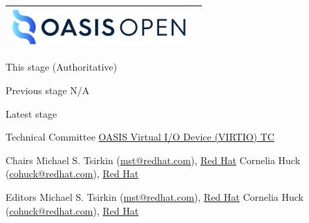 \begin{titlepage}
\thispagestyle{fancy}

\begin{tabular*}{\textwidth}{@{\extracolsep{\fill}}lr}
	\includegraphics[height=0.55in]{images/oasis.png}\\
	\hline
\end{tabular*}

\oasistitle{\virtioversion}
\oasisstagelabel{\virtiodraftstagename\virtiodraftstageextratitle}
\vspace{0.05in}
\oasisstagelabel{\virtioworkingdraftdate}

\begin{oasistitlesection}{This stage}
\virtiourltex{ }(Authoritative)\newline
\virtiourlpdf\newline
\virtiourlhtml
\end{oasistitlesection}

\begin{oasistitlesection}{Previous stage}
N/A
\end{oasistitlesection}

\begin{oasistitlesection}{Latest stage}
\virtiourllatestpdf\newline
\virtiourllatesthtml
\end{oasistitlesection}

\begin{oasistitlesection}{Technical Committee}
\href{https://www.oasis-open.org/committees/virtio/}{OASIS Virtual I/O Device (VIRTIO) TC}
\end{oasistitlesection}

\label{sec:Chair}
\begin{oasistitlesection}{Chairs}
Michael S. Tsirkin (\href{mailto:mst@redhat.com}{mst@redhat.com}), \href{https://www.redhat.com/}{Red Hat}\newline
Cornelia Huck (\href{mailto:cohuck@redhat.com}{cohuck@redhat.com}), \href{https://www.redhat.com/}{Red Hat}\newline
\end{oasistitlesection}

\begin{oasistitlesection}{Editors}
Michael S. Tsirkin (\href{mailto:mst@redhat.com}{mst@redhat.com}), \href{https://www.redhat.com/}{Red Hat}\newline
Cornelia Huck (\href{mailto:cohuck@redhat.com}{cohuck@redhat.com}), \href{https://www.redhat.com/}{Red Hat}\newline
\end{oasistitlesection}



\end{titlepage}
